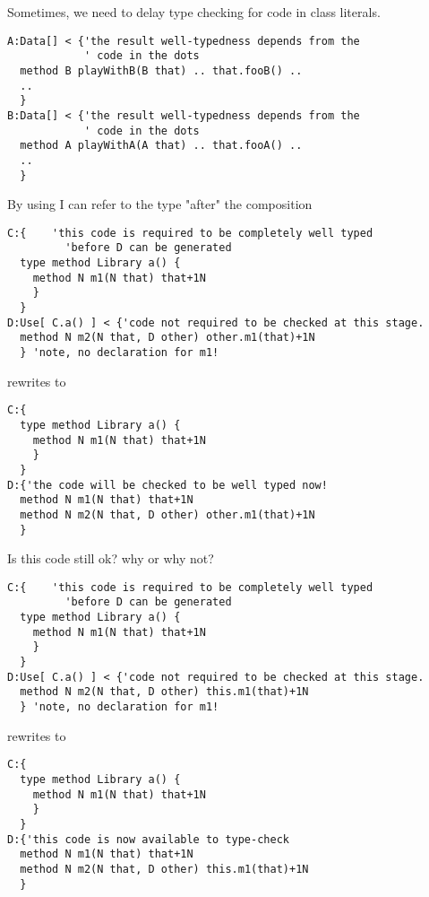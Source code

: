\begin{frame}[fragile]
Sometimes, we need to delay type checking for code in class literals.
\begin{NiceCode}{59ex}{0.8}
\begin{lstlisting}
A:Data[] < {'the result well-typedness depends from the
            ' code in the dots
  method B playWithB(B that) .. that.fooB() .. 
  ..
  }         
B:Data[] < {'the result well-typedness depends from the
            ' code in the dots
  method A playWithA(A that) .. that.fooA() ..  
  ..
  }         
\end{lstlisting}
\end{NiceCode}
\end{frame}

\begin{frame}[fragile]
By using \Q@D@ I can refer to the type "after" the composition
\begin{NiceCode}{59ex}{0.8}
\begin{lstlisting}
C:{    'this code is required to be completely well typed 
         'before D can be generated
  type method Library a() {
    method N m1(N that) that+1N
    }
  }
D:Use[ C.a() ] < {'code not required to be checked at this stage.
  method N m2(N that, D other) other.m1(that)+1N
  } 'note, no declaration for m1!
\end{lstlisting}
\end{NiceCode}
rewrites to 

\begin{NiceCode}{59ex}{0.8}
\begin{lstlisting}
C:{
  type method Library a() {
    method N m1(N that) that+1N
    }
  }
D:{'the code will be checked to be well typed now!
  method N m1(N that) that+1N
  method N m2(N that, D other) other.m1(that)+1N
  }   
\end{lstlisting}
\end{NiceCode}
\end{frame}


\begin{frame}[fragile]
Is this code still ok? why or why not?
\begin{NiceCode}{59ex}{0.8}
\begin{lstlisting}
C:{    'this code is required to be completely well typed 
         'before D can be generated
  type method Library a() {
    method N m1(N that) that+1N
    }
  }
D:Use[ C.a() ] < {'code not required to be checked at this stage.
  method N m2(N that, D other) this.m1(that)+1N
  } 'note, no declaration for m1!
\end{lstlisting}
\end{NiceCode}
rewrites to 

\begin{NiceCode}{59ex}{0.8}
\begin{lstlisting}
C:{
  type method Library a() {
    method N m1(N that) that+1N
    }
  }
D:{'this code is now available to type-check
  method N m1(N that) that+1N
  method N m2(N that, D other) this.m1(that)+1N
  }   
\end{lstlisting}
\end{NiceCode}
\end{frame}


